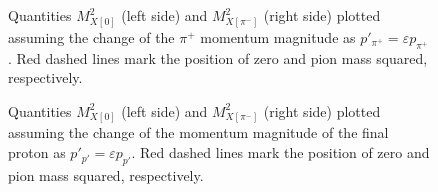 \begin{figure}[htp]
\begin{center}
\caption{\small Quantities $M_{X[0]}^{2}$ (left side) and $M_{X[\pi^{-}]}^{2}$ (right side) plotted assuming the change of the $\pi^{+}$ momentum magnitude as $p'_{\pi^{+}} = \varepsilon p_{\pi^{+}}$. Red dashed lines mark the position of zero and pion mass squared, respectively.  } \label{fig:mm_pip_fsi}
\end{center}
\end{figure}
\vspace{-1.5em}

\begin{figure}[htp]
\begin{center}
\caption{\small Quantities $M_{X[0]}^{2}$ (left side) and $M_{X[\pi^{-}]}^{2}$ (right side) plotted assuming the change of the momentum magnitude of the final proton as $p'_{p'} = \varepsilon p_{p'}$. Red dashed lines mark the position of zero and pion mass squared, respectively. } \label{fig:mm_pr_fsi}
\end{center}
\end{figure}
\vspace{-1.5em}

